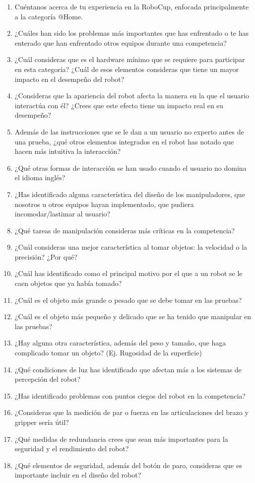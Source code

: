 \begin{enumerate}
    \item Cuéntanos acerca de tu experiencia en la RoboCup, enfocada principalmente a la categoría @Home.
    \item ¿Cuáles han sido los problemas más importantes que has enfrentado o te has enterado que han enfrentado otros equipos durante una competencia?
    \item ¿Cuál consideras que es el hardware mínimo que se requiere para participar en esta categoría? ¿Cuál de  esos elementos consideras que tiene un mayor impacto en el desempeño del robot?
    \item ¿Consideras que la apariencia del robot afecta la manera en la que el usuario interactúa con él? ¿Crees que este efecto tiene un impacto real en su desempeño?
    \item Además de las instrucciones que se le dan a un usuario no experto antes de una prueba, ¿qué otros elementos integrados en el robot has notado que hacen más intuitiva la interacción?
    \item ¿Qué otras formas de interacción se han usado cuando el usuario no domina el idioma inglés?
    \item ¿Has identificado alguna característica del diseño de los manipuladores, que nosotros u otros equipos hayan implementado, que pudiera incomodar/lastimar al usuario?
    \item ¿Qué tareas de manipulación consideras más críticas en la competencia?
    \item ¿Cuál consideras una mejor característica al tomar objetos: la velocidad o la precisión? ¿Por qué?
    \item ¿Cuál has identificado como el principal motivo por el que a un robot se le caen objetos que ya había tomado?
    \item ¿Cuál es el objeto más grande o pesado que se debe tomar en las pruebas?
    \item ¿Cuál es el objeto más pequeño y delicado que se ha tenido que manipular en las pruebas?
    \item ¿Hay alguna otra característica, además del peso y tamaño, que haga complicado tomar un objeto? (Ej. Rugosidad de la superficie)
    \item ¿Qué condiciones de luz has identificado que afectan más a los sistemas de percepción del robot?
    \item ¿Has identificado problemas con puntos ciegos del robot en la competencia?
    \item ¿Consideras que la medición de par o fuerza en las articulaciones del brazo y gripper sería útil?
    \item ¿Qué medidas de redundancia crees que sean más importantes para la seguridad y el rendimiento del robot?
    \item ¿Qué elementos de seguridad, además del botón de paro, consideras que es importante incluir en el diseño del robot?
\end{enumerate}

